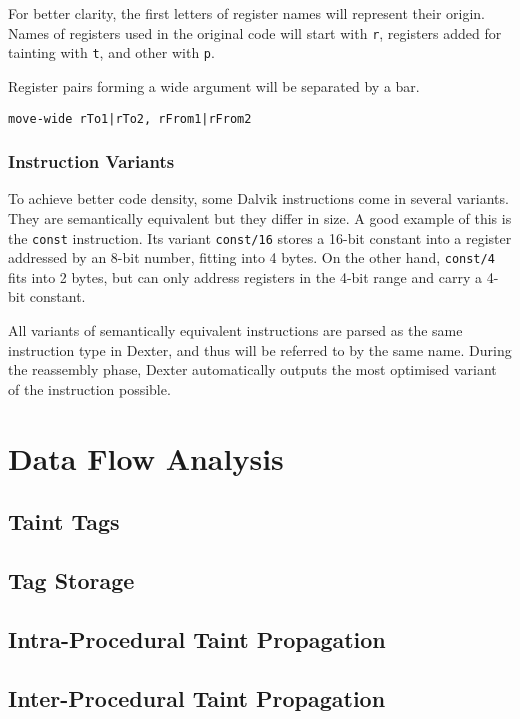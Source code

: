 \documentclass[12pt,twoside,notitlepage]{report}
\begin{document}
For better clarity, the first letters of register names will represent their origin. Names of registers used in the original code will start with \verb$r$, registers added for tainting with \verb$t$, and other with \verb$p$.

Register pairs forming a wide argument will be separated by a bar.
\begin{center}
\verb$move-wide rTo1|rTo2, rFrom1|rFrom2$
\end{center}

\subsubsection{Instruction Variants}

To achieve better code density, some Dalvik instructions come in several variants. They are semantically equivalent but they differ in size. A good example of this is the \verb$const$ instruction. Its variant \verb$const/16$ stores a 16-bit constant into a register addressed by an 8-bit number, fitting into 4 bytes. On the other hand, \verb$const/4$ fits into 2 bytes, but can only address registers in the 4-bit range and carry a 4-bit constant.

All variants of semantically equivalent instructions are parsed as the same instruction type in Dexter, and thus will be referred to  by the same name. During the reassembly phase, Dexter automatically outputs the most optimised variant of the instruction possible.

\section{Data Flow Analysis}



\subsection{Taint Tags}



\subsection{Tag Storage}

\subsection{Intra-Procedural Taint Propagation}

\subsection{Inter-Procedural Taint Propagation}
\end{document}
